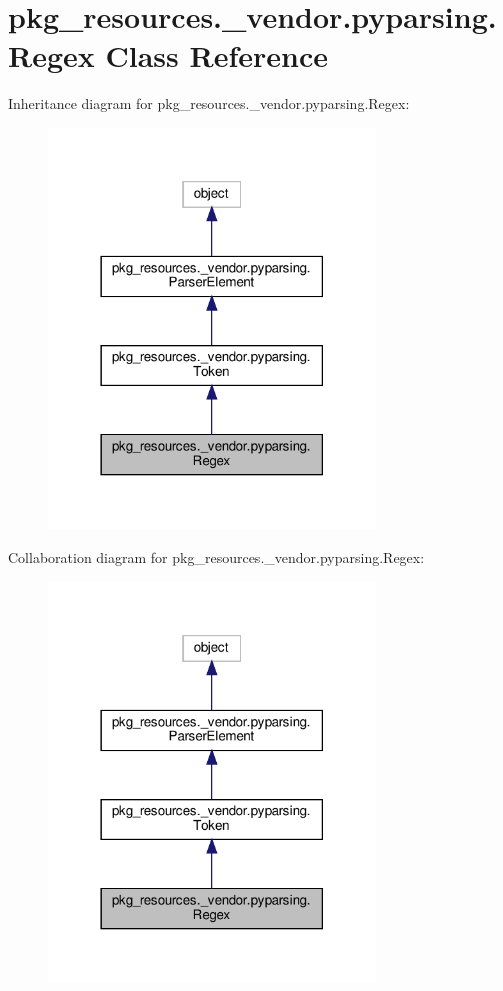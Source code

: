 \hypertarget{classpkg__resources_1_1__vendor_1_1pyparsing_1_1Regex}{}\section{pkg\+\_\+resources.\+\_\+vendor.\+pyparsing.\+Regex Class Reference}
\label{classpkg__resources_1_1__vendor_1_1pyparsing_1_1Regex}


Inheritance diagram for pkg\+\_\+resources.\+\_\+vendor.\+pyparsing.\+Regex\+:
\nopagebreak
\begin{figure}[H]
\begin{center}
\leavevmode
\includegraphics[width=246pt]{classpkg__resources_1_1__vendor_1_1pyparsing_1_1Regex__inherit__graph}
\end{center}
\end{figure}


Collaboration diagram for pkg\+\_\+resources.\+\_\+vendor.\+pyparsing.\+Regex\+:
\nopagebreak
\begin{figure}[H]
\begin{center}
\leavevmode
\includegraphics[width=246pt]{classpkg__resources_1_1__vendor_1_1pyparsing_1_1Regex__coll__graph}
\end{center}
\end{figure}
